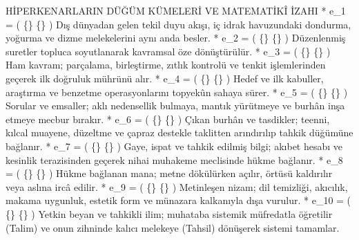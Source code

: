 \documentclass[11pt,a4paper]{article}
\begin{document}
HİPERKENARLARIN DÜĞÜM KÜMELERİ VE MATEMATİKÎ İZAHI
 * e_1 = ( \{\} \to \{\} )
   Dış dünyadan gelen tekil duyu akışı, iç idrak havuzundaki dondurma, yoğurma ve dizme melekelerini aynı anda besler.
 * e_2 = ( \{\} \to \{\} )
   Düzenlenmiş suretler topluca soyutlanarak kavramsal öze dönüştürülür.
 * e_3 = ( \{\} \to \{\} )
   Ham kavram; parçalama, birleştirme, zıtlık kontrolü ve tenkit işlemlerinden geçerek ilk doğruluk mührünü alır.
 * e_4 = ( \{\} \to \{\} )
   Hedef ve ilk kabuller, araştırma ve benzetme operasyonlarını topyekûn sahaya sürer.
 * e_5 = ( \{\} \to \{\} )
   Sorular ve emsaller; aklı nedensellik bulmaya, mantık yürütmeye ve burhân inşa etmeye mecbur bırakır.
 * e_6 = ( \{\} \to \{\} )
   Çıkan burhân ve tasdikler; teenni, kılcal muayene, düzeltme ve çapraz destekle taklitten arındırılıp tahkik düğümüne bağlanır.
 * e_7 = ( \{\} \to \{\} )
   Gaye, ispat ve tahkik edilmiş bilgi; akıbet hesabı ve kesinlik terazisinden geçerek nihai muhakeme meclisinde hükme bağlanır.
 * e_8 = ( \{\} \to \{\} )
   Hükme bağlanan mana; metne dökülürken açılır, örtüsü kaldırılır veya aslına ircâ edilir.
 * e_9 = ( \{\} \to \{\} )
   Metinleşen nizam; dil temizliği, akıcılık, makama uygunluk, estetik form ve münazara kalkanıyla dışa vurulur.
 * e_{10} = ( \{\} \to \{\} )
   Yetkin beyan ve tahkikli ilim; muhataba sistemik müfredatla öğretilir (Talim) ve onun zihninde kalıcı melekeye (Tahsil) dönüşerek sistemi tamamlar.
\end{document}
